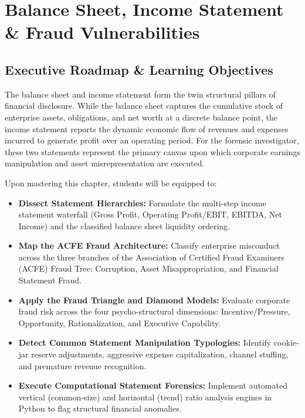 \chapter{Balance Sheet, Income Statement \& Fraud Vulnerabilities}

\section{Executive Roadmap \& Learning Objectives}

The balance sheet and income statement form the twin structural pillars of financial disclosure. While the balance sheet captures the cumulative stock of enterprise assets, obligations, and net worth at a discrete balance point, the income statement reports the dynamic economic flow of revenues and expenses incurred to generate profit over an operating period. For the forensic investigator, these two statements represent the primary canvas upon which corporate earnings manipulation and asset misrepresentation are executed.

\begin{tcolorbox}[colback=primarylight, colframe=primarydark, title={\textbf{Core Learning Competencies}}]
Upon mastering this chapter, students will be equipped to:
\begin{itemize}
    \item \textbf{Dissect Statement Hierarchies:} Formulate the multi-step income statement waterfall (Gross Profit, Operating Profit/EBIT, EBITDA, Net Income) and the classified balance sheet liquidity ordering.
    \item \textbf{Map the ACFE Fraud Architecture:} Classify enterprise misconduct across the three branches of the Association of Certified Fraud Examiners (ACFE) Fraud Tree: Corruption, Asset Misappropriation, and Financial Statement Fraud.
    \item \textbf{Apply the Fraud Triangle and Diamond Models:} Evaluate corporate fraud risk across the four psycho-structural dimensions: Incentive/Pressure, Opportunity, Rationalization, and Executive Capability.
    \item \textbf{Detect Common Statement Manipulation Typologies:} Identify cookie-jar reserve adjustments, aggressive expense capitalization, channel stuffing, and premature revenue recognition.
    \item \textbf{Execute Computational Statement Forensics:} Implement automated vertical (common-size) and horizontal (trend) ratio analysis engines in Python to flag structural financial anomalies.
\end{itemize}
\end{tcolorbox}

